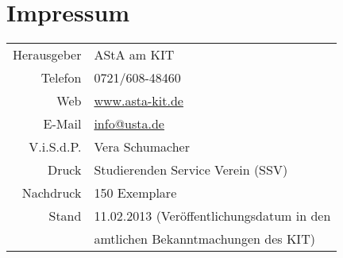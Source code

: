 \vspace*{\fill}
\section*{Impressum}
\begin{tabular}{rl}
	Herausgeber & AStA am KIT \\
	Telefon & 0721/608-48460 \\
	Web & \url{www.asta-kit.de} \\
	E-Mail & \href{mailto:info@usta.de}{info@usta.de}\\
	V.i.S.d.P. & Vera Schumacher\\
	Druck & Studierenden Service Verein (SSV)\\
	Nachdruck & 150 Exemplare\\
	Stand & 11.02.2013 (Veröffentlichungsdatum in den\\
& amtlichen Bekanntmachungen des KIT)
\end{tabular}
